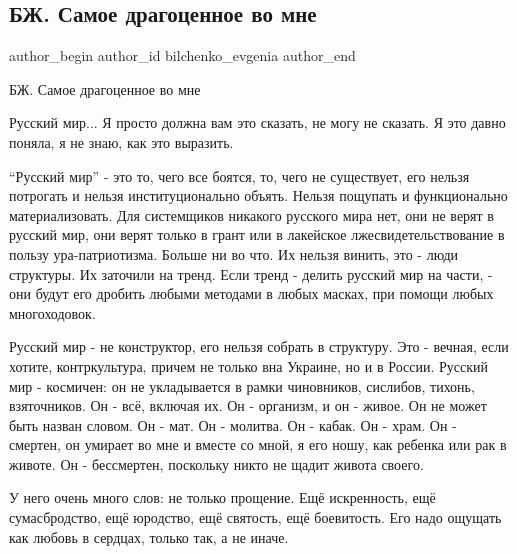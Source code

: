  
 
 
 
 
 
\subsection{БЖ. Самое драгоценное во мне}
\label{sec:19_12_2021.fb.bilchenko_evgenia.2.rusmir}
 
\ifcmt
 author_begin
   author_id bilchenko_evgenia
 author_end
\fi

БЖ. Самое драгоценное во мне

Русский мир... Я просто должна вам это сказать, не могу не сказать. Я это давно
поняла, я не знаю, как это выразить.


\enquote{Русский мир} - это то, чего все боятся, то, чего не существует, его нельзя
потрогать и нельзя институционально объять. Нельзя пощупать и функционально
материализовать. Для системщиков никакого русского мира нет, они не верят в
русский мир, они верят только в грант или в лакейское лжесвидетельствование в
пользу ура-патриотизма. Больше ни во что. Их нельзя винить, это - люди
структуры. Их заточили на тренд. Если тренд - делить русский мир на части, -
они будут его дробить любыми методами в любых масках, при помощи любых
многоходовок.

Русский мир - не конструктор, его нельзя собрать в структуру. Это - вечная,
если хотите, контркультура, причем не только вна Украине, но и в России.
Русский мир - космичен: он не укладывается в рамки чиновников, сислибов,
тихонь, взяточников. Он - всё, включая их. Он - организм, и он - живое. Он не
может быть назван словом. Он - мат. Он - молитва. Он - кабак. Он - храм. Он -
смертен, он умирает во мне и вместе со мной, я его ношу, как ребенка или рак в
животе. Он - бессмертен, поскольку никто не щадит живота своего.

У него очень много слов: не только прощение. Ещё искренность, ещё
сумасбродство, ещё юродство, ещё святость, ещё боевитость. Его надо ощущать как
любовь в сердцах, только так, а не иначе. 

